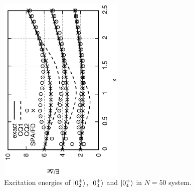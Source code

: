 \documentclass[%
superscriptaddress,
preprint,
showpacs,
nofootinbib,
amsmath,amssymb,
prc,
floatfix ]%
{revtex4-1}
\begin{document}

\begin{figure}[htbp]
 \begin{center}
  \includegraphics[width=60mm,angle=-90]{images/N50ex_energy2.eps}
 \end{center}
 \caption{Excitation energies of $\ket{0_2^+}$, $\ket{0_3^+}$ and $\ket{0_4^+}$ in $N=50$ system.}
 \label{fig:N50energy}
\end{figure}
\end{document}

